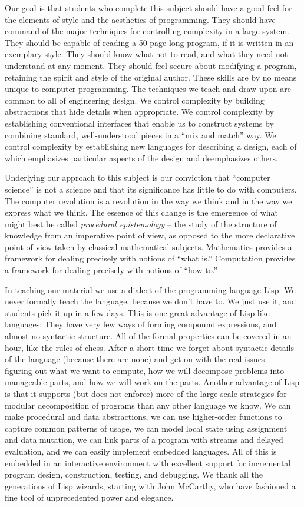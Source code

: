 Our goal is that students who complete this subject should have a good
feel for the elements of style and the aesthetics of programming.
They should have command of the major techniques for controlling
complexity in a large system. They should be capable of reading a
50-page-long program, if it is written in an exemplary style. They
should know what not to read, and what they need not understand at any
moment.  They should feel secure about modifying a program, retaining
the spirit and style of the original author.
These skills are by no means unique to computer programming.  The
techniques we teach and draw upon are common to all of engineering
design.  We control complexity by building abstractions that hide
details when appropriate.  We control complexity by establishing
conventional interfaces that enable us to construct systems by
combining standard, well-understood pieces in a ``mix and match'' way.
We control complexity by establishing new languages for describing a
design, each of which emphasizes particular aspects of the design and
deemphasizes others.

Underlying our approach to this subject is our conviction that
``computer science'' is not a science and that its significance has
little to do with computers.  The computer revolution is a revolution
in the way we think and in the way we express what we think.  The
essence of this change is the emergence of what might best be called
\textit{procedural epistemology} -- the study of the structure of
knowledge from an imperative point of view, as opposed to the more
declarative point of view taken by classical mathematical subjects.
Mathematics provides a framework for dealing precisely with notions of
``what is.''  Computation provides a framework for dealing precisely
with notions of ``how to.''

In teaching our material we use a dialect of the programming language
Lisp.  We never formally teach the language, because we don't have to.
We just use it, and students pick it up in a few days.  This is one
great advantage of Lisp-like languages: They have very few ways of
forming compound expressions, and almost no syntactic structure.  All
of the formal properties can be covered in an hour, like the rules of
chess.  After a short time we forget about syntactic details of the
language (because there are none) and get on with the real
issues -- figuring out what we want to compute, how we will decompose
problems into manageable parts, and how we will work on the parts.
Another advantage of Lisp is that it supports (but does not enforce)
more of the large-scale strategies for modular decomposition of
programs than any other language we know.  We can make procedural and
data abstractions, we can use higher-order functions to capture common
patterns of usage, we can model local state using assignment and data
mutation, we can link parts of a program with streams and delayed
evaluation, and we can easily implement embedded languages.  All of
this is embedded in an interactive environment with excellent support
for incremental program design, construction, testing, and debugging.
We thank all the generations of Lisp wizards, starting with John
McCarthy, who have fashioned a fine tool of unprecedented power and
elegance.

